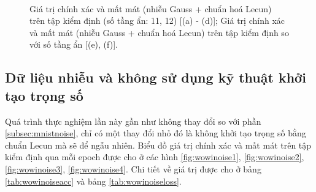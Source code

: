 \begin{figure}[ht!]
\begin{center}
{        }\\
%
    \end{center}
    \caption{%
        Giá trị chính xác và mất mát (nhiễu Gauss + chuẩn hoá Lecun) trên tập kiểm định (số tầng ẩn: 11, 12) [(a) - (d)]; Giá trị chính xác và mất mát (nhiễu Gauss + chuẩn hoá Lecun) trên tập kiểm định so với số tầng ẩn [(e), (f)].
     }%
  \label{fig:mnistnoise4}
\end{figure}

\clearpage

\subsection{Dữ liệu nhiễu và không sử dụng kỹ thuật khởi tạo trọng số}\label{subsec:mnistwowinoise}

Quá trình thực nghiệm lần này gần như không thay đổi so với phần \ref{subsec:mnistnoise}, chỉ có một thay đổi nhỏ đó là không khởi tạo trọng số bằng chuẩn Lecun mà sẽ để ngẫu nhiên.
Biểu đồ giá trị chính xác và mất mát trên tập kiểm định qua mỗi epoch được cho ở các hình \ref{fig:wowinoise1}, \ref{fig:wowinoise2}, \ref{fig:wowinoise3}, \ref{fig:wowinoise4}.
Chi tiết về giá trị được cho ở bảng \ref{tab:wowinoiseacc} và bảng \ref{tab:wowinoiseloss}.

